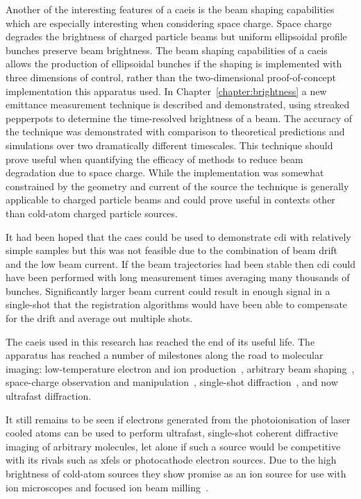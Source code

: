 Another of the interesting features of a \gls{caeis} is the beam shaping capabilities which are especially interesting when considering space charge.
Space charge degrades the brightness of charged particle beams but uniform ellipsoidal profile bunches preserve beam brightness.
The beam shaping capabilities of a \gls{caeis} allows the production of ellipsoidal bunches if the shaping is implemented with three dimensions of control, rather than the two-dimensional proof-of-concept implementation this apparatus used.
In Chapter~\ref{chapter:brightness} a new emittance measurement technique is described and demonstrated, using streaked pepperpots to determine the time-resolved brightness of a beam.
The accuracy of the technique was demonstrated with comparison to theoretical predictions and simulations over two dramatically different timescales.
This technique should prove useful when quantifying the efficacy of methods to reduce beam degradation due to space charge.
While the implementation was somewhat constrained by the geometry and current of the source the technique is generally applicable to charged particle beams and could prove useful in contexts other than cold-atom charged particle sources.

It had been hoped that the \gls{caes} could be used to demonstrate \gls{cdi} with relatively simple samples but this was not feasible due to the combination of beam drift and the low beam current.
If the beam trajectories had been stable then \gls{cdi} could have been performed with long measurement times averaging many thousands of bunches.
Significantly larger beam current could result in enough signal in a single-shot that the registration algorithms would have been able to compensate for the drift and average out multiple shots.

The \gls{caeis} used in this research has reached the end of its useful life.
The apparatus has reached a number of milestones along the road to molecular imaging: low-temperature electron and ion production~\cite{saliba_spatial_2012,mcculloch_high-coherence_2013,mcculloch_field_2017,speirs_identification_2017}, arbitrary beam shaping~\cite{mcculloch_arbitrarily_2011}, space-charge observation and manipulation~\cite{murphy_detailed_2014,murphy_increasing_2015,thompson_suppression_2016}, single-shot diffraction~\cite{speirs_single-shot_2015}, and now ultrafast diffraction.

It still remains to be seen if electrons generated from the photoionisation of laser cooled atoms can be used to perform ultrafast, single-shot coherent diffractive imaging of arbitrary molecules, let alone if such a source would be competitive with its rivals such as \glspl{xfel} or photocathode electron sources.
Due to the high brightness of cold-atom sources they show promise as an ion source for use with ion microscopes and focused ion beam milling~\cite{steele_high-brightness_2017}.

